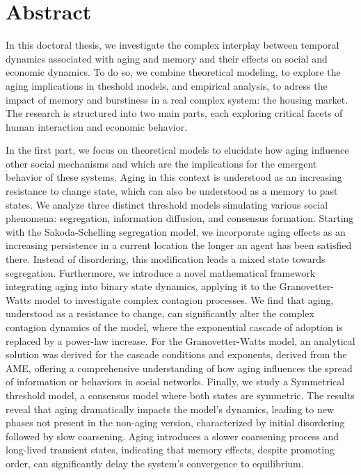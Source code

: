 \pagebreak
\thispagestyle{empty}
\section*{Abstract}

In this doctoral thesis, we investigate the complex interplay between temporal dynamics associated with aging and memory and their effects on social and economic dynamics. To do so, we combine theoretical modeling, to explore the aging implications in theshold models, and empirical analysis, to adress the impact of memory and burstiness in a real complex system: the housing market. The research is structured into two main parts, each exploring critical facets of human interaction and economic behavior.

In the first part, we focus on theoretical models to elucidate how aging influence other social mechanisms and which are the implications for the emergent behavior of these systems. Aging in this context is understood as an increasing resistance to change state, which can also be understood as a memory to past states. We analyze three distinct threshold models simulating various social phenomena: segregation, information diffusion, and consensus formation. Starting with the Sakoda-Schelling segregation model, we incorporate aging effects as an increasing persistence in a current location the longer an agent has been satisfied there. Instead of disordering, this modification leads a mixed state towards segregation. Furthermore, we introduce a novel mathematical framework integrating aging into binary state dynamics, applying it to the Granovetter-Watts model to investigate complex contagion processes. We find that aging, understood as a resistance to change, can significantly alter the complex contagion dynamics of the model, where the exponential cascade of adoption is replaced by a power-law increase. For the Granovetter-Watts model, an analytical solution was derived for the cascade conditions and exponents, derived from the AME, offering a comprehensive understanding of how aging influences the spread of information or behaviors in social networks. Finally, we study a Symmetrical threshold model, a consensus model where both states are symmetric. The results reveal that aging dramatically impacts the model's dynamics, leading to new phases not present in the non-aging version, characterized by initial disordering followed by slow coarsening. Aging introduces a slower coarsening process and long-lived transient states, indicating that memory effects, despite promoting order, can significantly delay the system's convergence to equilibrium.

